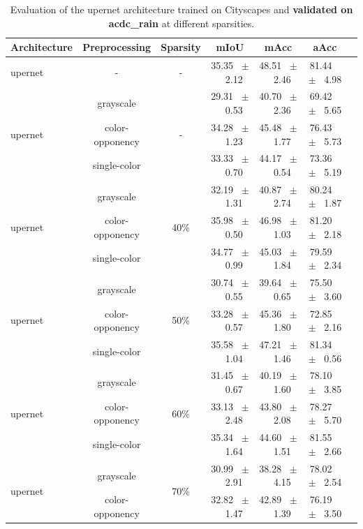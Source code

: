 \begin{table}[h]
  \centering
  \caption{Evaluation of the upernet architecture trained on Cityscapes and \textbf{validated on acdc_rain} at different sparsities.}
  \begin{tabular}{@{}lccc ccc@{}}
    \toprule
    Architecture & Preprocessing & Sparsity & mIoU & mAcc & aAcc \\
    \midrule
    upernet & - & - & 35.35 ~$\pm$~ 2.12 & 48.51 ~$\pm$~ 2.46 & 81.44 ~$\pm$~ 4.98 \\
    \midrule
    \midrule
    \multirow{3}{*}{upernet} & grayscale & \multirow{3}{*}{-} & 29.31 ~$\pm$~ 0.53 & 40.70 ~$\pm$~ 2.36 & 69.42 ~$\pm$~ 5.65 \\
    & color-opponency & & 34.28 ~$\pm$~ 1.23 & 45.48 ~$\pm$~ 1.77 & 76.43 ~$\pm$~ 5.73 \\
    & single-color & & 33.33 ~$\pm$~ 0.70 & 44.17 ~$\pm$~ 0.54 & 73.36 ~$\pm$~ 5.19 \\
    \midrule
    \multirow{3}{*}{upernet} & grayscale & \multirow{3}{*}{40\%} & 32.19 ~$\pm$~ 1.31 & 40.87 ~$\pm$~ 2.74 & 80.24 ~$\pm$~ 1.87 \\
    & color-opponency & & 35.98 ~$\pm$~ 0.50 & 46.98 ~$\pm$~ 1.03 & 81.20 ~$\pm$~ 2.18 \\
    & single-color & & 34.77 ~$\pm$~ 0.99 & 45.03 ~$\pm$~ 1.84 & 79.59 ~$\pm$~ 2.34 \\
    \midrule
    \multirow{3}{*}{upernet} & grayscale & \multirow{3}{*}{50\%} & 30.74 ~$\pm$~ 0.55 & 39.64 ~$\pm$~ 0.65 & 75.50 ~$\pm$~ 3.60 \\
    & color-opponency & & 33.28 ~$\pm$~ 0.57 & 45.36 ~$\pm$~ 1.80 & 72.85 ~$\pm$~ 2.16 \\
    & single-color & & 35.58 ~$\pm$~ 1.04 & 47.21 ~$\pm$~ 1.46 & 81.34 ~$\pm$~ 0.56 \\
    \midrule
    \multirow{3}{*}{upernet} & grayscale & \multirow{3}{*}{60\%} & 31.45 ~$\pm$~ 0.67 & 40.19 ~$\pm$~ 1.60 & 78.10 ~$\pm$~ 3.85 \\
    & color-opponency & & 33.13 ~$\pm$~ 2.48 & 43.80 ~$\pm$~ 2.08 & 78.27 ~$\pm$~ 5.70 \\
    & single-color & & 35.34 ~$\pm$~ 1.64 & 44.60 ~$\pm$~ 1.51 & 81.55 ~$\pm$~ 2.66 \\
    \midrule
    \multirow{3}{*}{upernet} & grayscale & \multirow{3}{*}{70\%} & 30.99 ~$\pm$~ 2.91 & 38.28 ~$\pm$~ 4.15 & 78.02 ~$\pm$~ 2.54 \\
    & color-opponency & & 32.82 ~$\pm$~ 1.47 & 42.89 ~$\pm$~ 1.39 & 76.19 ~$\pm$~ 3.50 \\

\end{tabular}
\end{table}
